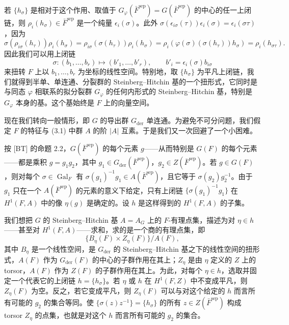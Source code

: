 若 $\{h_\sigma\}$ 是相对于这个作用、取值于 $G_\varphi(\bar F^{\mathrm{sep}})=G(\bar F^{\mathrm{sep}})$ 的中心的任一上闭链，则 $\rho_i(h_\sigma)\in\bar F^{\mathrm{sep}}$ 是一个纯量 $\epsilon_i(\sigma)$。此外 $\sigma(\epsilon_{i\sigma}(\tau))\epsilon_i(\sigma)=\epsilon_i(\sigma\tau)$，因为
\[
\sigma(\rho_{i\sigma}(h_\tau))\rho_i(h_\sigma)
=\rho_{i\sigma}(\sigma(h_\tau))\rho_i(h_\sigma)
=\rho_i(\varphi(\sigma)(\sigma(h_\tau))h_\sigma)=\rho_i(h_{\sigma\tau}).
\]
因此我们可以用上闭链
\begin{equation}\tag{3.14}
\sigma:(b_1,\dots,b_r)\mapsto(b'_1,\dots,b'_r),
\qquad b'_i=\epsilon_i(\sigma)b_{i\sigma}
\end{equation}
来扭转 $F$ 上以 $b_1,\dots,b_r$ 为坐标的线性空间。特别地，取 $\{h_\sigma\}$ 为平凡上闭链，我们就得到半单、单连通、分裂群的 Steinberg–Hitchin 基的一个扭形式，它同时是与同态 $\varphi$ 相联系的拟分裂群 $G_\varphi$ 的任何内形式的 Steinberg–Hitchin 基，特别是 $G_\varphi$ 本身的基。这个基始终是 $F$ 上的向量空间。

现在我们转向一般情形，即 $G$ 的导出群 $G_{\mathrm{der}}$ 单连通。为避免不可分问题，我们假定 $F$ 的特征与 (3.1) 中群 $A$ 的阶 $|A|$ 互素。于是我们又一次回避了一个小困难。

按 [BT] 的命题 2.2，$G(\bar F^{\mathrm{sep}})$ 的每个元素 $g$——从而特别是 $G(F)$ 的每个元素——都是乘积 $g=g_1g_2$，其中 $g_1\in G_{\mathrm{der}}(\bar F^{\mathrm{sep}})$，$g_2\in Z(\bar F^{\mathrm{sep}})$。若 $g\in G(F)$，则对每个 $\sigma\in\operatorname{Gal}_F$ 有 $\sigma(g_1)^{-1}g_1\in A(\bar F^{\mathrm{sep}})$，且它等于 $\sigma(g_2)g_2^{-1}$。由于 $g_1$ 只在一个 $A(\bar F^{\mathrm{sep}})$ 的元素的意义下给定，只有上闭链 $\{\sigma(g_1)^{-1}g_1\}$ 在 $H^1(F,A)$ 中的像 $\eta(g)$ 是确定的。设 $h$ 是这样得到的 $H^1(F,A)$ 的子集。

我们想把 $G$ 的 Steinberg–Hitchin 基 $A=A_G$ 上的 $F$-有理点集，描述为对 $\eta\in h$——甚至对 $H^1(F,A)$——求和，求的是一个商的有理点集，即
\begin{equation}\tag{3.15}
\{B_\eta(F)\times Z_\eta(F)\}/A(F),
\end{equation}
其中 $B_\eta$ 是一个线性空间，是 $G_{\mathrm{der}}$ 的 Steinberg–Hitchin 基之下的线性空间的扭形式，$A(F)$ 作为 $G_{\mathrm{der}}(F)$ 的中心的子群作用在其上；$Z_\eta$ 是由 $\eta$ 定义的 $Z$ 上的 torsor，$A(F)$ 作为 $Z(F)$ 的子群作用在其上。为此，对每个 $\eta\in h$，选取并固定一个代表它的上闭链 $h=\{h_\sigma\}$。若 $\eta$ 或 $h$ 在 $H^1(F,Z)$ 中不变成平凡，则 $Z_\eta(F)$ 为空。反之，若它变成平凡，则 $Z_\eta(F)$ 可以与对这个给定的 $h$ 而言所有可能的 $g_2$ 的集合等同。使 $\{\sigma(z)z^{-1}\}=\{h_\sigma\}$ 的所有 $z\in Z(\bar F^{\mathrm{sep}})$ 构成 torsor $Z_\eta$ 的点集，也就是对这个 $h$ 而言所有可能的 $g_2$ 的集合。

